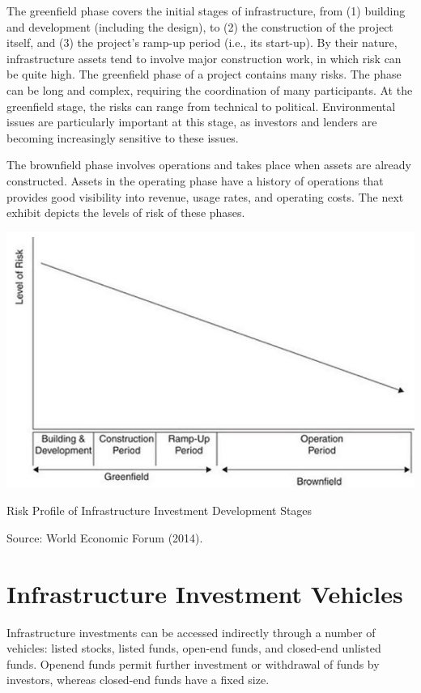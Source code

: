 \documentclass[11pt]{article}
\begin{document}
The greenfield phase covers the initial stages of infrastructure, from (1) building and development (including the design), to (2) the construction of the project itself, and (3) the project's ramp-up period (i.e., its start-up). By their nature, infrastructure assets tend to involve major construction work, in which risk can be quite high. The greenfield phase of a project contains many risks. The phase can be long and complex, requiring the coordination of many participants. At the greenfield stage, the risks can range from technical to political. Environmental issues are particularly important at this stage, as investors and lenders are becoming increasingly sensitive to these issues.

The brownfield phase involves operations and takes place when assets are already constructed. Assets in the operating phase have a history of operations that provides good visibility into revenue, usage rates, and operating costs. The next exhibit depicts the levels of risk of these phases.

\begin{center}
\includegraphics[max width=\textwidth]{2024_04_11_801fecba73bcef68aff8g-4}
\end{center}

Risk Profile of Infrastructure Investment Development Stages

Source: World Economic Forum (2014).

\section*{Infrastructure Investment Vehicles}
Infrastructure investments can be accessed indirectly through a number of vehicles: listed stocks, listed funds, open-end funds, and closed-end unlisted funds. Openend funds permit further investment or withdrawal of funds by investors, whereas closed-end funds have a fixed size.
\end{document}
